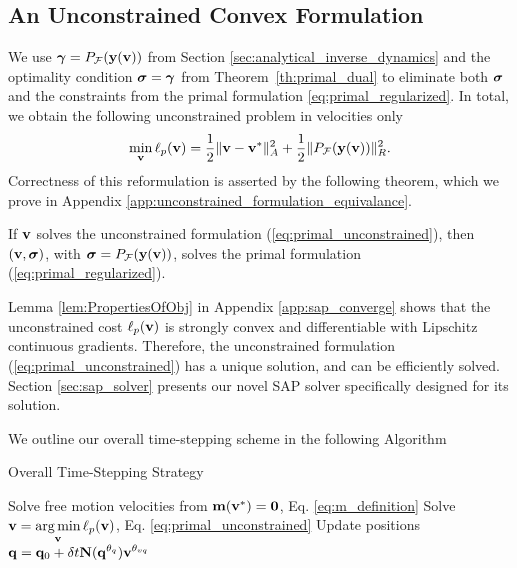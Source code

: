 
\subsection{An Unconstrained Convex Formulation}
\label{sec:unconstrained_convex_formulation}

We use ${\bm\gamma} = P_{\mathcal{F}}({\mathbf{y}}({\mathbf{v}}))$ from Section
\ref{sec:analytical_inverse_dynamics} and the optimality condition ${\bm{\sigma}}
= {\bm\gamma}$ from Theorem~\ref{th:primal_dual} to eliminate both ${\bm{\sigma}}$ and
the constraints from the primal formulation \eqref{eq:primal_regularized}. In
total, we obtain the following unconstrained problem in velocities only
\begin{eqnarray}
	\min_{\mf{v}} \ell_p(\mf{v}) = \frac{1}{2}\Vert\mf{v}-\mf{v}^*\Vert_{A}^2 +
	\frac{1}{2}\Vert P_\mathcal{F}(\mf{y}(\mf{v}))\Vert_R^2.
	\label{eq:primal_unconstrained}
\end{eqnarray}
Correctness of this reformulation is asserted by the following theorem, which we
prove in Appendix \ref{app:unconstrained_formulation_equivalance}.
\begin{theorem}
  If  ${\mathbf{v}}$ solves the unconstrained formulation
    (\ref{eq:primal_unconstrained}), then $({\mathbf{v}}, {\bm\sigma})$, with ${\bm\sigma}
    =P_\mathcal{F}({\mathbf{y}}({\mathbf{v}}))$, solves the primal formulation
    (\ref{eq:primal_regularized}).
    \label{th:unconstrained_formulation_equivalance}
\end{theorem}
Lemma \ref{lem:PropertiesOfObj} in Appendix \ref{app:sap_converge} shows that
the unconstrained cost $\ell_p({\mathbf{v}})$ is strongly convex and differentiable
with Lipschitz continuous gradients. Therefore, the unconstrained formulation
(\ref{eq:primal_unconstrained}) has a unique solution, and can be efficiently
solved.  
Section \ref{sec:sap_solver} presents our novel SAP solver specifically designed
for its solution.

We outline our overall time-stepping scheme in the following Algorithm
\begin{algorithm}[H]
	\caption{Overall Time-Stepping Strategy}
	  \label{alg:sap_time_stepping}
	  \begin{algorithmic}[1]
		  \State Solve free motion velocities from
		  ${\mathbf{m}}({\mathbf{v}}^*)={\mathbf{0}}$, Eq. \eqref{eq:m_definition}
		  \State Solve $\displaystyle {\mathbf{v}} = \operatorname*{arg\,min}_{{\mathbf{v}}} \ell_p({\mathbf{v}})$, Eq. \eqref{eq:primal_unconstrained}
		  \State Update positions $\displaystyle {\mathbf{q}} = {\mathbf{q}}_0 + \delta t{\mathbf{N}}({\mathbf{q}}^{\theta_{q}}){\mathbf{v}}^{\theta_{vq}}$ 	
	  \end{algorithmic}
\end{algorithm}

